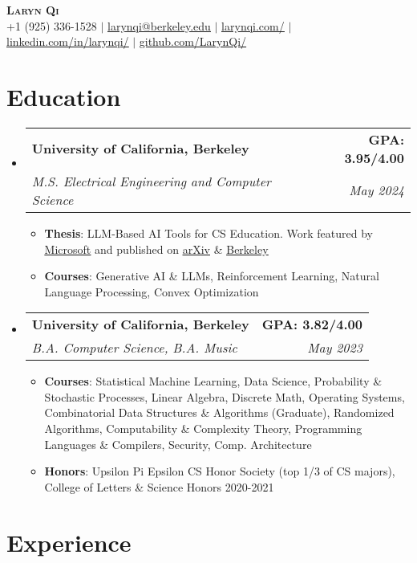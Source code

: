 \documentclass[letterpaper,11pt]{article}
\makeatletter
\newcommand{\resumeItemBF}[2]{
  \item\small{
    \textbf{#1}{: #2 \vspace{-4pt}}
  }
}
\newcommand{\resumeSubheading}[4]{
  \vspace{-2pt}\item
    \begin{tabular*}{0.97\textwidth}[t]{l@{\extracolsep{\fill}}r}
      \textbf{#1} & #2 \\
      \textit{\small#3} & \textit{\small #4} \\
    \end{tabular*}\vspace{-8pt}
}
\newcommand{\resumeSubHeadingListStart}{\begin{itemize}[leftmargin=0.05in, label={}]}
\newcommand{\resumeSubHeadingListEnd}{\end{itemize}}
\newcommand{\resumeItemListStart}{\begin{itemize}[leftmargin=0.2in]}
\newcommand{\resumeItemListEnd}{\end{itemize}\vspace{-5pt}}
\makeatother
\begin{document}
\begin{center}
    \textbf{\Huge \scshape Laryn Qi} \\ \vspace{1pt}
    \small +1 (925) 336-1528 $|$ \href{mailto:larynqi@berkeley.edu}{\underline{larynqi@berkeley.edu}} $|$ \href{https://larynqi.com/}{\underline{larynqi.com/}} $|$
    \href{https://www.linkedin.com/in/larynqi/}{\underline{linkedin.com/in/larynqi/}} $|$
    \href{https://github.com/LarynQi/}{\underline{github.com/LarynQi/}}
\end{center}
\vspace{-15pt}


\section{Education}

\resumeSubHeadingListStart
    \resumeSubheading
            {University of California, Berkeley}{\textbf{GPA: 3.95/4.00}}{M.S. Electrical Engineering and Computer Science}{May 2024}
            \resumeItemListStart
                \resumeItemBF{Thesis}{LLM-Based AI Tools for CS Education. Work featured by \href{https://www.microsoft.com/en-us/education/blog/2024/09/uc-berkeley-enhances-computer-science-education-with-azure-openai-service/}{\underline{Microsoft}} and published on \href{https://arxiv.org/abs/2406.05603}{\underline{arXiv}} \& \href{https://www2.eecs.berkeley.edu/Pubs/TechRpts/2024/EECS-2024-132.html}{\underline{Berkeley}}}
                \resumeItemBF{Courses}{Generative AI \& LLMs, Reinforcement Learning, Natural Language Processing, Convex Optimization}
            \resumeItemListEnd
    \resumeSubheading
        {University of California, Berkeley}{\textbf{GPA: 3.82/4.00}}{B.A. Computer Science, B.A. Music}{May 2023}
        \resumeItemListStart
            \resumeItemBF{Courses}{Statistical Machine Learning, Data Science, Probability \& Stochastic Processes, Linear Algebra, Discrete Math,  Operating Systems, Combinatorial Data Structures \& Algorithms (Graduate), Randomized Algorithms, Computability \& Complexity Theory, Programming Languages \& Compilers, Security, Comp. Architecture}
            \resumeItemBF{Honors}{Upsilon Pi Epsilon CS Honor Society (top 1/3 of CS majors), College of Letters \& Science Honors 2020-2021}
        \resumeItemListEnd
\resumeSubHeadingListEnd


\section{Experience}
\end{document}
